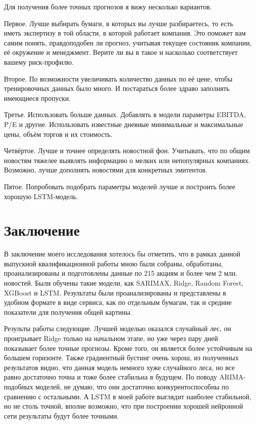 \documentclass[12pt, a4paper]{article}
\begin{document}
Для получения более точных прогнозов я вижу несколько вариантов.

Первое. Лучше выбирать бумаги, в которых вы лучше разбираетесь, то есть иметь экспертизу в той области, в которой работает компания. Это поможет вам самим понять, правдоподобен ли прогноз, учитывая текущее состояник компании, её окружение и менеджмент. Верите ли вы в такое и насколько соответствует вашему риск-профилю.

Второе. По возможности увеличивать количество данных по её цене, чтобы тренировочных данных было много. И постараться более здраво заполнять имеющиеся пропуски.

Третье. Использовать больше данных. Добавлять в модели параметры EBITDA, P/E и другие. Использовать известные дневные минимальные и максимальные цены, объём торгов и их стоимость.

Четвёртое. Лучше и точнее определять новостной фон. Учитывать, что по общим новостям тяжелее выявлять информацию о мелких или непопулярных компаниях. Возможно, лучше дополнять новостями для конкретных эмитентов.

Пятое. Попробовать подобрать параметры моделей лучше и построить более хорошую LSTM-модель.

\section{Заключение}

В заключение моего исследования хотелось бы отметить, что в рамках данной выпускной квалификационной работы мною были собраны, обработаны, проанализированы и подготовлены данные по 215 акциям и более чем 2 млн. новостей. Были обучены такие модели, как SARIMAX, Ridge, Random Forest, XGBoost и LSTM. Результаты были проанализированы и представлены в удобном формате в виде сервиса, как по отдельным бумагам, так и средние показатели для получения общей картины.

Результы работы следующие. Лучшей моделью оказался случайный лес, он проигрывает Ridge только на начальном этапе, но уже через пару дней показывает более точные прогнозы. Кроме того, он является более устойчивым на большем горизонте. Также градиентный бустинг очень хорош, из полученных результатов видно, что данная модель немного хуже случайного леса, но все равно достаточно точна и тоже более стабильна в будущем. По поводу ARIMA-подобных моделей, не думаю, что они достаточно конкурентоспособны по сравнению с остальными. А LSTM в моей работе выглядит наиболее стабильной, но не столь точной, вполне возможно, что при построении хорошей нейронной сети результаты будут более точными.
\end{document}
